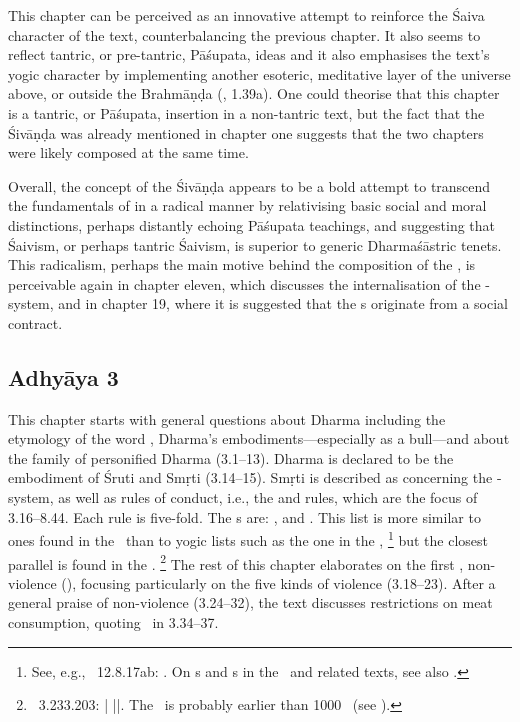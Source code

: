 This chapter can be perceived as an innovative attempt to reinforce the
Śaiva character of the text, counterbalancing the previous chapter.
It also seems to reflect tantric, or pre-tantric, Pāśupata, ideas and 
it also emphasises the text's yogic character by implementing 
another esoteric, meditative layer of the universe above, or outside
the Brahmāṇḍa (, 1.39a). One could theorise that
this chapter is a tantric, or Pāśupata, insertion in a non-tantric text, 
but the fact that the Śivāṇḍa was already mentioned in chapter 
one suggests that the two chapters were likely composed at the same time.
 
Overall, the concept of the Śivāṇḍa appears to be
a bold attempt to transcend the fundamentals of 
in a radical manner by relativising basic social and moral distinctions, perhaps
distantly echoing Pāśupata teachings, and suggesting that Śaivism, or perhaps
tantric Śaivism, is superior to generic Dharmaśāstric tenets. This radicalism,
perhaps the main motive behind the composition of the \VSS, is perceivable
again in chapter eleven, which discusses the internalisation of the -system, and 
in chapter 19, where it is suggested that the s originate from a social contract.
 



\subsection{Adhyāya 3}\label{contents_of_ch03}

This chapter starts with general questions about Dharma
including the etymology of the word , 
Dharma's embodiments---especially as a bull---and 
about the family of personified Dharma (3.1--13).
Dharma is declared to be the embodiment of Śruti and Smṛti (3.14--15).
Smṛti is described as concerning the -system, as well as 
rules of conduct, i.e., the  and  rules, which are the
focus of 3.16--8.44. Each  rule is five-fold.
The s are: , and . This list is more similar to
ones found in the \MBh\ than to yogic lists such as the one in the
\YS,%
		\footnote{See, e.g., \MBh\ 12.8.17ab: 
						.
						On s and s in the \SDHS\ and related
					   texts, see also .}
but the closest parallel is found in the \VDhU.%
		\footnote{\VDHU\ 3.233.203:
				 |
				 ||.
						The \VDhU\ is probably earlier than 1000 \CE\ (see 
						).}
The rest of this chapter elaborates on the first , 
non-violence (), focusing particularly on the five kinds of violence (3.18--23).
After a general praise of non-violence (3.24--32), the text discusses restrictions on meat consumption, quoting \Manu\ in 3.34--37.


